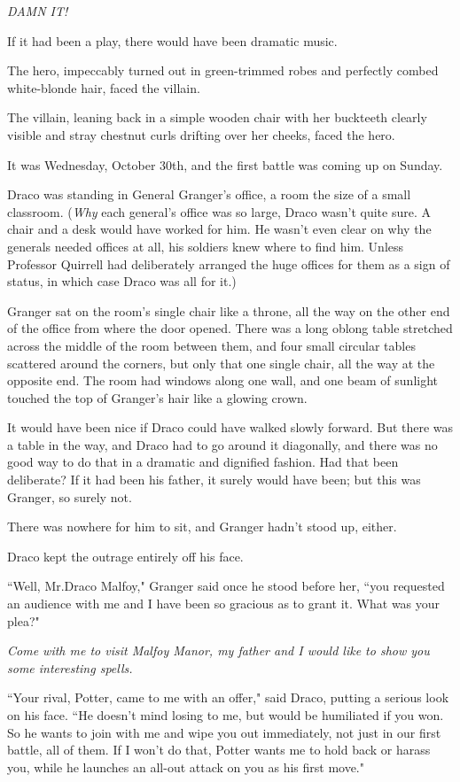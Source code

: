 \emph{DAMN IT!}

\later

If it had been a play, there would have been dramatic music.

The hero, impeccably turned out in green-trimmed robes and perfectly combed white-blonde hair, faced the villain.

The villain, leaning back in a simple wooden chair with her buckteeth clearly visible and stray chestnut curls drifting over her cheeks, faced the hero.

It was Wednesday, October 30th, and the first battle was coming up on Sunday.

Draco was standing in General Granger's office, a room the size of a small classroom. (\emph{Why} each general's office was so large, Draco wasn't quite sure. A chair and a desk would have worked for him. He wasn't even clear on why the generals needed offices at all, his soldiers knew where to find him. Unless Professor Quirrell had deliberately arranged the huge offices for them as a sign of status, in which case Draco was all for it.)

Granger sat on the room's single chair like a throne, all the way on the other end of the office from where the door opened. There was a long oblong table stretched across the middle of the room between them, and four small circular tables scattered around the corners, but only that one single chair, all the way at the opposite end. The room had windows along one wall, and one beam of sunlight touched the top of Granger's hair like a glowing crown.

It would have been nice if Draco could have walked slowly forward. But there was a table in the way, and Draco had to go around it diagonally, and there was no good way to do that in a dramatic and dignified fashion. Had that been deliberate? If it had been his father, it surely would have been; but this was Granger, so surely not.

There was nowhere for him to sit, and Granger hadn't stood up, either.

Draco kept the outrage entirely off his face.

``Well, Mr.\?Draco Malfoy," Granger said once he stood before her, ``you requested an audience with me and I have been so gracious as to grant it. What was your plea?"

\emph{Come with me to visit Malfoy Manor, my father and I would like to show you some interesting spells.}

``Your rival, Potter, came to me with an offer," said Draco, putting a serious look on his face. ``He doesn't mind losing to me, but would be humiliated if you won. So he wants to join with me and wipe you out immediately, not just in our first battle, all of them. If I won't do that, Potter wants me to hold back or harass you, while he launches an all-out attack on you as his first move."

